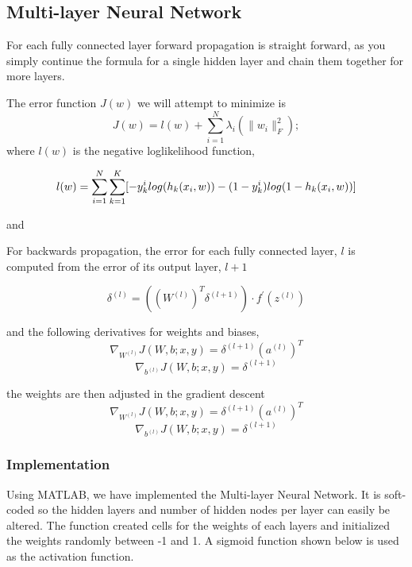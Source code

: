 \documentclass[12pt, twocolumn]{article}
\begin{document}
\subsection{Multi-layer Neural Network}


For each fully connected layer forward propagation is straight forward, as you simply continue the formula for a single hidden layer and chain them together for more layers. 

The error function $J(w)$ we will attempt to minimize is 
\begin{equation}
J(w)= l(w) + \sum_{i=1}^N\lambda_{i}(\|w_i\|_F^2);
\end{equation}
where $l(w)$ is the negative loglikelihood function,

\begin{equation}
\scriptsize
l(w)=\sum_{i=1}^N \sum_{k=1}^K [-y^i_k log(h_k(x_i,w))-(1-y^i_k)log(1-h_k(x_i,w))]
\end{equation}

and 

For backwards propagation, the error for each fully connected layer, $l$ is computed from the error of its output layer, $l+1$  

\begin{equation}
\delta^{(l)}=((W^{(l)})^T \delta^{(l+1)}) \cdot f ^{\prime} (z^{(l)})
\end{equation}

and the following derivatives for weights and biases, 
\begin{equation}
\nabla_{W^{(l)}}J(W,b;x,y) = \delta^{(l+1)}(a^{(l)})^T
\end{equation}
\begin{equation}
\nabla_{b^{(l)}}J(W,b;x,y)= \delta^{(l+1)}
\end{equation}

the weights are then adjusted in the gradient descent
\begin{equation}
\nabla_{W^{(l)}}J(W,b;x,y) = \delta^{(l+1)}(a^{(l)})^T
\end{equation}
\begin{equation}
\nabla_{b^{(l)}}J(W,b;x,y)= \delta^{(l+1)}
\end{equation}


\subsubsection{Implementation}
Using MATLAB, we have implemented the Multi-layer Neural Network. It is soft-coded so the hidden layers and number of hidden nodes per layer can easily be altered. The function created cells for the weights of each layers and initialized the weights randomly between -1 and 1.
\newline
A sigmoid function shown below is used as the activation function.
\end{document}

